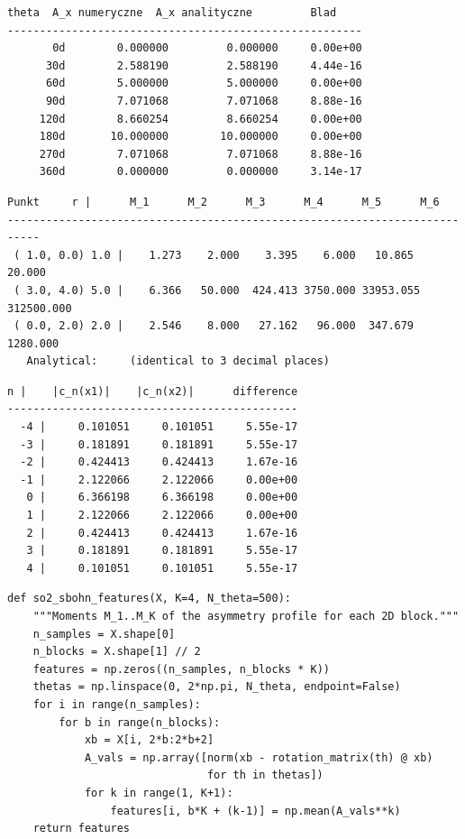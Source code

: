 \documentclass[11pt,a4paper]{report}
\begin{document}
\label{app:ch4-lst5}
\begin{lstlisting}[style=textstyle, caption={Comparison of numerical $A_x(\theta)$ with~$2r|\sin\frac{\theta}{2}|$, $x=(3,4)$, $r=5$}]
     theta  A_x numeryczne  A_x analityczne         Blad
-------------------------------------------------------
       0d        0.000000         0.000000     0.00e+00
      30d        2.588190         2.588190     4.44e-16
      60d        5.000000         5.000000     0.00e+00
      90d        7.071068         7.071068     8.88e-16
     120d        8.660254         8.660254     0.00e+00
     180d       10.000000        10.000000     0.00e+00
     270d        7.071068         7.071068     8.88e-16
     360d        0.000000         0.000000     3.14e-17
\end{lstlisting}

\label{app:ch4-lst6}
\begin{lstlisting}[style=textstyle, caption={Moments $M_1$--$M_6$: numerical vs.\ analytical}]
   Punkt     r |      M_1      M_2      M_3      M_4      M_5      M_6
---------------------------------------------------------------------------
 ( 1.0, 0.0) 1.0 |    1.273    2.000    3.395    6.000   10.865   20.000
 ( 3.0, 4.0) 5.0 |    6.366   50.000  424.413 3750.000 33953.055 312500.000
 ( 0.0, 2.0) 2.0 |    2.546    8.000   27.162   96.000  347.679 1280.000
   Analytical:     (identical to 3 decimal places)
\end{lstlisting}

\label{app:ch4-lst7}
\begin{lstlisting}[style=textstyle, caption={$|c_n|$ for two points with the same $r=5$: $x_1=(3,4)$, $x_2=(0,5)$}]
   n |    |c_n(x1)|    |c_n(x2)|      difference
---------------------------------------------
  -4 |     0.101051     0.101051     5.55e-17
  -3 |     0.181891     0.181891     5.55e-17
  -2 |     0.424413     0.424413     1.67e-16
  -1 |     2.122066     2.122066     0.00e+00
   0 |     6.366198     6.366198     0.00e+00
   1 |     2.122066     2.122066     0.00e+00
   2 |     0.424413     0.424413     1.67e-16
   3 |     0.181891     0.181891     5.55e-17
   4 |     0.101051     0.101051     5.55e-17
\end{lstlisting}

\label{app:ch4-lst8}
\begin{lstlisting}[style=python, caption={Data generation and SO(2)-SBOHN classification}]
def so2_sbohn_features(X, K=4, N_theta=500):
    """Moments M_1..M_K of the asymmetry profile for each 2D block."""
    n_samples = X.shape[0]
    n_blocks = X.shape[1] // 2
    features = np.zeros((n_samples, n_blocks * K))
    thetas = np.linspace(0, 2*np.pi, N_theta, endpoint=False)
    for i in range(n_samples):
        for b in range(n_blocks):
            xb = X[i, 2*b:2*b+2]
            A_vals = np.array([norm(xb - rotation_matrix(th) @ xb) 
                               for th in thetas])
            for k in range(1, K+1):
                features[i, b*K + (k-1)] = np.mean(A_vals**k)
    return features
\end{lstlisting}
\end{document}
